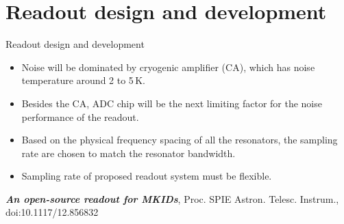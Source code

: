 \documentclass[ignorenonframetext,12pt]{beamer}
\begin{document}
\section{Readout design and development}
\begin{frame}{Readout design and development}


				\begin{itemize}
								\item Noise will be \alert{dominated by cryogenic amplifier (CA)}, which has noise
												temperature around 2 to 5\,K. 
								\item Besides the CA, ADC chip will be \alert{the next limiting factor for the
												noise performance of the readout}. 

								\item	Based on the physical frequency spacing of all the resonators, \alert{the
												sampling rate are chosen to match the resonator bandwidth}. 

								\item	Sampling rate of proposed readout system must be
												{\color[rgb]{0.2,0.9,0.3}flexible}.  
				\end{itemize}

				\tiny{\emph{\textbf{An open-source readout for MKIDs}}, Proc. SPIE Astron.
				Telesc.  Instrum., doi:10.1117/12.856832}
\end{frame}
\end{document}
